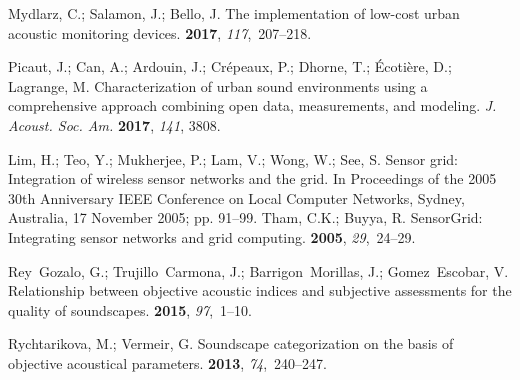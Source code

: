\documentclass[sensors,article,accept,moreauthors,pdftex,10pt,a4paper]{mdpi}
\begin{document}
%
\begin{thebibliography}{999}
\providecommand{\natexlab}[1]{#1}

Mydlarz, C.; Salamon, J.; Bello, J.
\newblock The implementation of low-cost urban acoustic monitoring devices.
 {\bf 2017}, {\em 117},~207--218.

Picaut, J.; Can, A.; Ardouin, J.; Cr{\'e}peaux, P.; Dhorne, T.;
  {\'E}coti{\`e}re, D.; Lagrange, M.
\newblock Characterization of urban sound environments using a comprehensive
  approach combining open data, measurements, and modeling.
\newblock   \emph{J. Acoust. Soc. Am. }  \textbf{2017}, \emph{141}, 3808.

Lim, H.; Teo, Y.; Mukherjee, P.; Lam, V.; Wong, W.; See, S.
\newblock Sensor grid: Integration of wireless sensor networks and the grid.
\newblock In Proceedings of the 2005 30th Anniversary IEEE Conference on Local Computer Networks, {Sydney,  Australia, 17 November } 2005; pp. 91--99.
Tham, C.K.; Buyya, R.
\newblock SensorGrid: Integrating sensor networks and grid computing.
 {\bf 2005}, {\em 29},~24--29.

Rey~Gozalo, G.; Trujillo~Carmona, J.; Barrigon~Morillas, J.; Gomez~Escobar, V.
\newblock Relationship between objective acoustic indices and subjective
  assessments for the quality of soundscapes.
 {\bf 2015}, {\em 97},~1--10.

Rychtarikova, M.; Vermeir, G.
\newblock Soundscape categorization on the basis of objective acoustical
  parameters.
 {\bf 2013}, {\em 74},~240--247.


\end{thebibliography}
\end{document}
